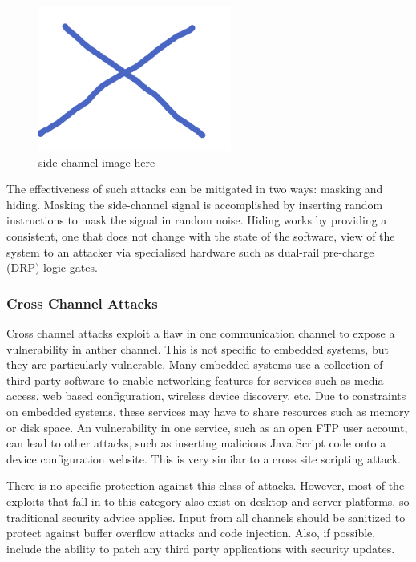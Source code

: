 \documentclass[final,conference,11pt]{IEEEtran}
\begin{document}
\begin{figure}[!t]
\centering
\includegraphics[width=2.5in]{topology}
\caption{side channel image here}
\label{fig:side_chan}
\end{figure}

The effectiveness of such attacks can be mitigated in two ways: masking and hiding.  Masking the side-channel signal is accomplished by inserting random instructions to mask the signal in random noise.  Hiding works by providing a consistent, one that does not change with the state of the software, view of the system to an attacker via specialised hardware such as dual-rail pre-charge (DRP) logic gates.\cite{papers??}

\subsubsection{Cross Channel Attacks}
Cross channel attacks exploit a flaw in one communication channel to expose a vulnerability in anther channel.  This is not specific to embedded systems, but they are particularly vulnerable.  Many embedded systems use a collection of third-party software to enable networking features for services such as media access, web based configuration, wireless device discovery, etc.  Due to constraints on embedded systems, these services may have to share resources such as memory or disk space.   An vulnerability in one service, such as an open FTP user account, can lead to other attacks, such as inserting malicious Java Script code onto a device configuration website.  This is very similar to a cross site scripting attack.

There is no specific protection against this class of attacks.  However, most of the exploits that fall in to this category also exist on desktop and server platforms, so traditional security advice applies.  Input from all channels should be sanitized to protect against buffer overflow attacks and code injection.  Also, if possible, include the ability to patch any third party applications with security updates. \cite{emerge ccs paper}
\end{document}
